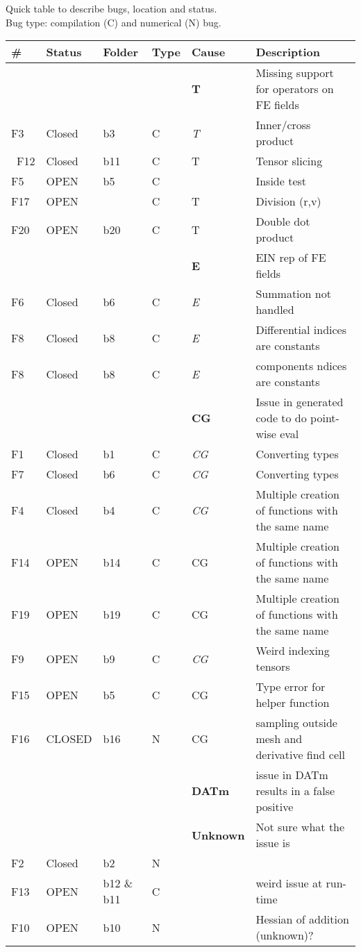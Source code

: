 \documentclass{article}
\newcommand{\fontit}[1]{\textit{#1}}
\begin{document}
Quick table to describe bugs, location and status.\\
Bug type: compilation (C) and numerical (N) bug.\\
\newline 
\begin{tabular}{|l|ll|lll|}
\hline
\# & Status & Folder&Type & Cause & Description \\
\hline
&&&&\textbf{T}& Missing support for operators on FE fields\\
 F3 &Closed&b3  & C &\fontit{T}& Inner/cross product  \\\
  F12 &Closed & b11 & C &T & Tensor slicing\\
   F5 &OPEN&b5 &C && Inside test\\
F17 &OPEN &  & C &T & Division (r,v)\\
  F20 &OPEN & b20 & C &T & Double dot product\\
&&&&\textbf{E}& EIN rep of FE fields\\
 F6 &Closed &b6 &C &\fontit{E} & Summation not handled \\
  F8 &Closed &b8 &C &  \fontit{E}&Differential indices are constants\\
    F8 &Closed &b8 &C &  \fontit{E}&components ndices are constants\\
&&&&\textbf{CG}& Issue in generated code  to do point-wise eval\\
 F1 &Closed& b1 & C &\fontit{CG}& Converting types\\
F7 &Closed& b6  &C & \fontit{CG}& Converting types\\
 F4 &Closed&b4  & C &\fontit{CG}&Multiple creation of functions with the same name \\
F14 &OPEN & b14 &C& CG&Multiple creation of functions with the same name\\
F19 &OPEN & b19 &C& CG&Multiple creation of functions with the same name\\
   F9 &OPEN&b9 &C &  \fontit{CG}& Weird indexing tensors\\
 F15 &OPEN&b5 &C & CG & Type error for helper function\\
  F16 &CLOSED & b16 & N  & CG & sampling outside mesh and derivative find cell  \\
&&&&\textbf{DATm}& issue in DATm results in a false positive\\
&&&&\textbf{Unknown}& Not sure what the issue is\\
 F2 &Closed &b2 & N & &\\
  F13 &OPEN & b12 \& b11 &  C&  &weird issue at run-time\\
 F10 &OPEN &b10 &N &&  Hessian of addition (unknown)?\\

\hline
\end{tabular}
\\
\end{document}
